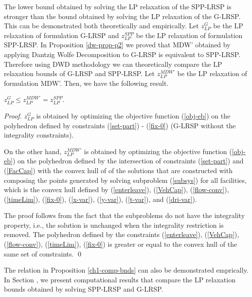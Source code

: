 The lower bound obtained by solving the  LP relaxation of
the SPP-LRSP is stronger than the bound obtained by solving the  
LP relaxation of the G-LRSP. This can be demonstrated both theoretically
and empirically. Let $z_{LP}^{G}$ be the LP relaxation of formulation
G-LRSP and $z_{LP}^{SPP}$ be the LP relaxation of formulation
SPP-LRSP. In Proposition \ref{dw-prop-p2} we proved that 
MDW' obtained by applying Dantzig Wolfe Decomposition to G-LRSP
is equivalent to SPP-LRSP. Therefore using DWD methodology we 
can theoretically compare the LP relaxation bounds of G-LRSP 
and SPP-LRSP. Let $z_{LP}^{MDW'}$ be the LP relaxation of
formulation MDW'. Then, we have the following result. 
\begin{prop}
\label{ch1-comp-bnds}
$z_{LP}^{G}\leq z_{LP}^{MDW'} = z_{LP}^{SPP}$.
\end{prop}
\begin{proof}
$z_{LP}^{G}$ is obtained by optimizing the objective function
(\ref{obj-eb}) on the polyhedron defined by constraints 
(\ref{set-part}) - (\ref{fix-0}) (G-LRSP without the integrality 
constraints). 

On the other hand, $z_{LP}^{MDW'}$
is obtained by optimizing the objective function (\ref{obj-eb})
on the polyhedron defined by the intersection of constraints 
(\ref{set-part}) and (\ref{FacCap}) with the convex hull of
of the solutions that are constructed with composing the points 
generated by solving subproblem (\ref{subsys}) for all facilities,
which is the convex hull defined by (\ref{enterleave}), 
 (\ref{VehCap}), (\ref{flow-conv}), (\ref{timeLim}), (\ref{fix-0}), 
(\ref{x-var}), (\ref{y-var}), (\ref{t-var}), and (\ref{dri-var}).

The proof follows from the fact that the subproblems do not have 
the integrality property, i.e., the solution is unchanged when the 
integrality restriction is removed. The polyhedron defined by the 
constraints (\ref{enterleave}), (\ref{VehCap}), (\ref{flow-conv}), 
(\ref{timeLim}), (\ref{fix-0}) is greater or equal to the 
convex hull of the same set of constraints.  
\qed
\end{proof} 

The relation in Proposition  \ref{ch1-comp-bnds} can also
be demonstrated emprically. In Section , 
we present computational results that compare the LP relaxation bounds 
obtained by solving SPP-LRSP and G-LRSP.  
 

